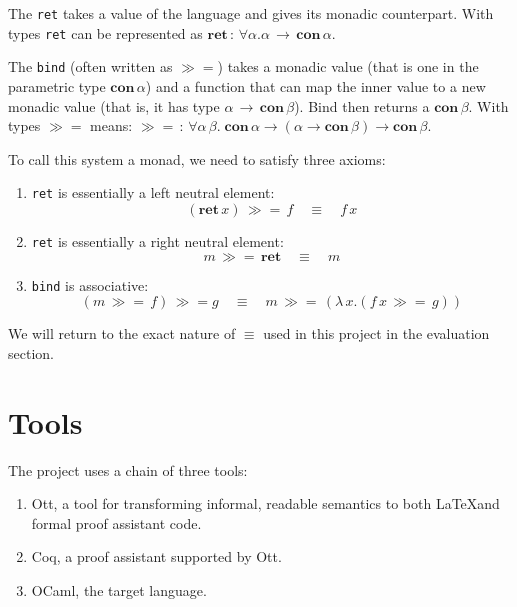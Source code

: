 \documentclass[12pt,twoside,notitlepage]{report}
\begin{document}
The \lstinline|ret| takes a value of the language and gives its monadic counterpart. With types \lstinline|ret| can be represented as $ \textbf{ret} \, :\, \forall \alpha. \alpha\, \rightarrow\, \textbf{con}\, \alpha $.

The \lstinline|bind| (often written as $ \gg= $)  takes a monadic value (that is one in the parametric type $ \textbf{con} \, \alpha $) and a function that can map the inner value to a new monadic value (that is, it has type $ \alpha \, \rightarrow \, \textbf{con} \, \beta $). Bind then returns a $ \textbf{con} \, \beta $. With types $ \gg= $ means: $ \gg= \, : \, \forall \alpha \, \beta. \; \textbf{con} \, \alpha \rightarrow (\alpha \rightarrow \textbf{con} \, \beta) \rightarrow \textbf{con} \, \beta $.

To call this system a monad, we need to satisfy three axioms:

\begin{enumerate}
\item{\lstinline|ret| is essentially a left neutral element:
\[ (\textbf{ret} \, x) \, \gg=\, f \quad \equiv \quad f \, x \]}
\item{\lstinline|ret| is essentially a right neutral element:
\[ m \, \gg=\, \textbf{ret} \quad \equiv \quad m \]}
\item{\lstinline|bind| is associative:
\[ (m \, \gg= \, f) \, \gg= g \quad \equiv \quad m\, \gg= \, (\lambda\, x. (f\, x \, \gg= \, g) ) \]}
\end{enumerate}

We will return to the exact nature of $ \equiv $ used in this project in the evaluation section.


\section{Tools}
The project uses a chain of three tools: \begin{enumerate}
\item{
Ott, a tool for transforming informal, readable semantics to both \LaTeX and formal proof assistant code.}
\item{Coq, a proof assistant supported by Ott. }
\item{OCaml, the target language. }
\end{enumerate}
\end{document}
